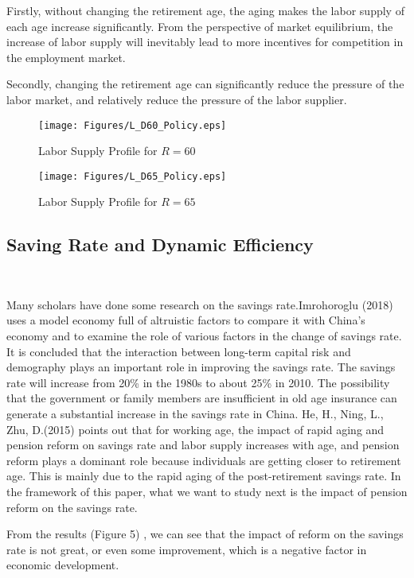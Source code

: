 \documentclass{article}
\begin{document}
        Firstly, without changing the retirement age, the aging makes the labor supply of each age increase significantly. From the perspective of market equilibrium, the increase of labor supply will inevitably lead to more incentives for competition in the employment market.

        Secondly, changing the retirement age can significantly reduce the pressure of the labor market, and relatively reduce the pressure of the labor supplier.
        
        \begin{figure}[H] 
            \centering
            \texttt{[image: Figures/L\_D60\_Policy.eps]}
            \caption{Labor Supply Profile for $R=60$}
        \end{figure}

        \begin{figure}[H] 
            \centering
            \texttt{[image: Figures/L\_D65\_Policy.eps]}
            \caption{Labor Supply Profile for $R=65$}
        \end{figure}


    \subsection{Saving Rate and Dynamic Efficiency}
        ~\

        Many scholars have done some research on the savings rate.Imrohoroglu (2018) uses a model economy full of altruistic factors to compare it with China's economy and to examine the role of various factors in the change of savings rate. It is concluded that the interaction between long-term capital risk and demography plays an important role in improving the savings rate. The savings rate will increase from 20\% in the 1980s to about 25\% in 2010. The possibility that the government or family members are insufficient in old age insurance can generate a substantial increase in the savings rate in China.
        He, H., Ning, L., Zhu, D.(2015) points out that for working age, the impact of rapid aging and pension reform on savings rate and labor supply increases with age, and pension reform plays a dominant role because individuals are getting closer to retirement age. This is mainly due to the rapid aging of the post-retirement savings rate.
        In the framework of this paper, what we want to study next is the impact of pension reform on the savings rate.

        

        From the results (Figure 5) , we can see that the impact of reform on the savings rate is not great, or even some improvement, which is a negative factor in economic development.
        
\end{document}
